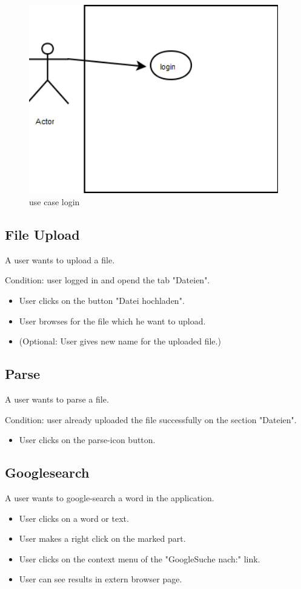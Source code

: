\begin{figure}[!ht]
  \centering
    \includegraphics[width=0.97\textwidth]{images/use_cases/login.png}
  \caption{use case login}
  \label{fig:use case login}
\end{figure}

\subsection{File Upload}
A user wants to upload a file.

Condition: user logged in and opend the tab "Dateien".

\begin{itemize}
\item User clicks on the button "Datei hochladen".
\item User browses for the file which he want to upload.
\item (Optional: User gives new name for the uploaded file.)
\end{itemize}

\subsection{Parse}
A user wants to parse a file.

Condition: user already uploaded the file successfully on the section "Dateien".

\begin{itemize}
\item User clicks on the parse-icon button.
\end{itemize}

\subsection{Googlesearch}
A user wants to google-search a word in the application.

\begin{itemize}
\item User clicks on a word or text.
\item User makes a right click on the marked part.
\item User clicks on the context menu of the  "GoogleSuche nach:" link.
\item User can see results in extern browser page.
\end{itemize}